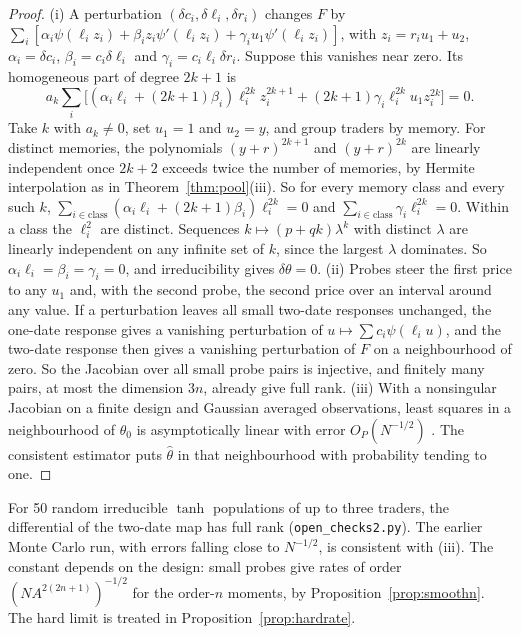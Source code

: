 \begin{proof}
(i) A perturbation $(\delta c_i,\delta\ell_i,\delta r_i)$ changes $F$ by $\sum_i[\alpha_i\psi(\ell_iz_i)+\beta_iz_i\psi'(\ell_iz_i)+\gamma_iu_1\psi'(\ell_iz_i)]$, with $z_i=r_iu_1+u_2$, $\alpha_i=\delta c_i$, $\beta_i=c_i\delta\ell_i$ and $\gamma_i=c_i\ell_i\delta r_i$. Suppose this vanishes near zero. Its homogeneous part of degree $2k+1$ is
\[
a_k\sum_i\bigl[(\alpha_i\ell_i+(2k+1)\beta_i)\ell_i^{2k}z_i^{2k+1}+(2k+1)\gamma_i\ell_i^{2k}u_1z_i^{2k}\bigr]=0 .
\]
Take $k$ with $a_k\ne0$, set $u_1=1$ and $u_2=y$, and group traders by memory. For distinct memories, the polynomials $(y+r)^{2k+1}$ and $(y+r)^{2k}$ are linearly independent once $2k+2$ exceeds twice the number of memories, by Hermite interpolation as in Theorem~\ref{thm:pool}(iii). So for every memory class and every such $k$, $\sum_{i\in\text{class}}(\alpha_i\ell_i+(2k+1)\beta_i)\ell_i^{2k}=0$ and $\sum_{i\in\text{class}}\gamma_i\ell_i^{2k}=0$. Within a class the $\ell_i^2$ are distinct. Sequences $k\mapsto(p+qk)\lambda^k$ with distinct $\lambda$ are linearly independent on any infinite set of $k$, since the largest $\lambda$ dominates. So $\alpha_i\ell_i=\beta_i=\gamma_i=0$, and irreducibility gives $\delta\theta=0$.
(ii) Probes steer the first price to any $u_1$ and, with the second probe, the second price over an interval around any value. If a perturbation leaves all small two-date responses unchanged, the one-date response gives a vanishing perturbation of $u\mapsto\sum c_i\psi(\ell_iu)$, and the two-date response then gives a vanishing perturbation of $F$ on a neighbourhood of zero. So the Jacobian over all small probe pairs is injective, and finitely many pairs, at most the dimension $3n$, already give full rank.
(iii) With a nonsingular Jacobian on a finite design and Gaussian averaged observations, least squares in a neighbourhood of $\theta_0$ is asymptotically linear with error $O_P(N^{-1/2})$ \citep{vandervaart1998}. The consistent estimator puts $\hat\theta$ in that neighbourhood with probability tending to one.
\end{proof}

For 50 random irreducible $\tanh$ populations of up to three traders, the differential of the two-date map has full rank (\nolinkurl{open_checks2.py}). The earlier Monte Carlo run, with errors falling close to $N^{-1/2}$, is consistent with (iii). The constant depends on the design: small probes give rates of order $(NA^{2(2n+1)})^{-1/2}$ for the order-$n$ moments, by Proposition~\ref{prop:smoothn}. The hard limit is treated in Proposition~\ref{prop:hardrate}.


